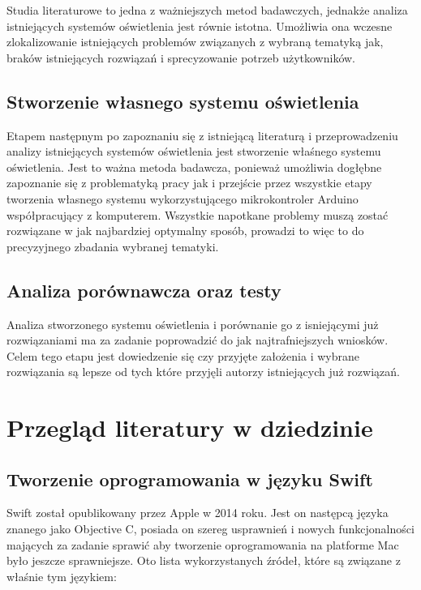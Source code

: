 \documentclass[12pt]{report}
\begin{document}
Studia literaturowe to jedna z ważniejszych metod badawczych, jednakże analiza istniejących systemów oświetlenia jest równie istotna. Umożliwia ona wczesne zlokalizowanie istniejących problemów związanych z wybraną tematyką jak, braków istniejących rozwiązań i sprecyzowanie potrzeb użytkowników.

\subsection{Stworzenie własnego systemu oświetlenia}

Etapem następnym po zapoznaniu się z istniejącą literaturą i przeprowadzeniu analizy istniejących systemów oświetlenia jest stworzenie właśnego systemu oświetlenia. Jest to ważna metoda badawcza,
ponieważ umożliwia dogłębne zapoznanie się z problematyką pracy jak i przejście przez wszystkie etapy tworzenia własnego systemu wykorzystującego mikrokontroler Arduino współpracujący z komputerem. Wszystkie napotkane problemy muszą zostać rozwiązane w jak najbardziej optymalny sposób, prowadzi to więc to do precyzyjnego zbadania wybranej tematyki.

\subsection{Analiza porównawcza oraz testy}

Analiza stworzonego systemu oświetlenia i porównanie go z isniejącymi już rozwią\-zaniami ma za zadanie poprowadzić do jak najtrafniejszych wniosków. Celem tego etapu jest dowiedzenie się czy przyjęte założenia i wybrane rozwiązania są lepsze od tych które przyjęli autorzy istniejących już rozwiązań.

\section{Przegląd literatury w dziedzinie} \label{literatura}

\subsection{Tworzenie oprogramowania w języku Swift}

Swift został opublikowany przez Apple w 2014 roku. Jest on następcą języka znanego jako Objective C, posiada on szereg usprawnień i nowych funkcjonalności mających za zadanie sprawić aby tworzenie oprogramowania na platforme Mac było jeszcze sprawniejsze. Oto lista wykorzystanych źródeł, które są związane z właśnie tym językiem:
\end{document}

